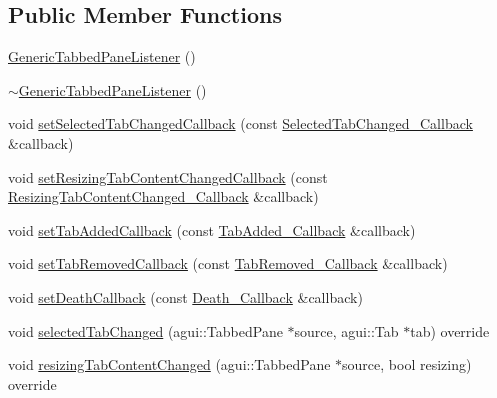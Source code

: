 \subsection*{Public Member Functions}
\begin{DoxyCompactItemize}
\item 
\mbox{\hyperlink{classec_1_1_generic_tabbed_pane_listener_a959bfe958603706e1efbf1359c2533bb}{Generic\+Tabbed\+Pane\+Listener}} ()
\item 
\mbox{\hyperlink{classec_1_1_generic_tabbed_pane_listener_a06db790c2576810ef8a759c9a780aa4d}{$\sim$\+Generic\+Tabbed\+Pane\+Listener}} ()
\item 
void \mbox{\hyperlink{classec_1_1_generic_tabbed_pane_listener_ad74c260a9808fff690dbae8e21075492}{set\+Selected\+Tab\+Changed\+Callback}} (const \mbox{\hyperlink{classec_1_1_generic_tabbed_pane_listener_adbb9c0a73499ce6b26ba1c8569cb8525}{Selected\+Tab\+Changed\+\_\+\+Callback}} \&callback)
\item 
void \mbox{\hyperlink{classec_1_1_generic_tabbed_pane_listener_a84b64063845563fedf375ad3ab4881a2}{set\+Resizing\+Tab\+Content\+Changed\+Callback}} (const \mbox{\hyperlink{classec_1_1_generic_tabbed_pane_listener_a41097f0918f8888f9e970e9c9a5f0d52}{Resizing\+Tab\+Content\+Changed\+\_\+\+Callback}} \&callback)
\item 
void \mbox{\hyperlink{classec_1_1_generic_tabbed_pane_listener_a8dbe036522e0fef51b5617a396725592}{set\+Tab\+Added\+Callback}} (const \mbox{\hyperlink{classec_1_1_generic_tabbed_pane_listener_aef726cc6897d8994602cb127693e664d}{Tab\+Added\+\_\+\+Callback}} \&callback)
\item 
void \mbox{\hyperlink{classec_1_1_generic_tabbed_pane_listener_a270e9b954f7674566c323f5d420c79eb}{set\+Tab\+Removed\+Callback}} (const \mbox{\hyperlink{classec_1_1_generic_tabbed_pane_listener_a806d9a110845a5bdcb4b10e7fb57beca}{Tab\+Removed\+\_\+\+Callback}} \&callback)
\item 
void \mbox{\hyperlink{classec_1_1_generic_tabbed_pane_listener_a2da654f2864c7224a37bcc6cc0535d5a}{set\+Death\+Callback}} (const \mbox{\hyperlink{classec_1_1_generic_tabbed_pane_listener_a158699bc84b6a145e3dafec53ab63061}{Death\+\_\+\+Callback}} \&callback)
\item 
void \mbox{\hyperlink{classec_1_1_generic_tabbed_pane_listener_a4ab165822e9a5772be852520a6ee189c}{selected\+Tab\+Changed}} (agui\+::\+Tabbed\+Pane $\ast$source, agui\+::\+Tab $\ast$tab) override
\item 
void \mbox{\hyperlink{classec_1_1_generic_tabbed_pane_listener_aa75a279b781f32aeaf5adf8249a2aa0f}{resizing\+Tab\+Content\+Changed}} (agui\+::\+Tabbed\+Pane $\ast$source, bool resizing) override

\end{DoxyCompactItemize}
